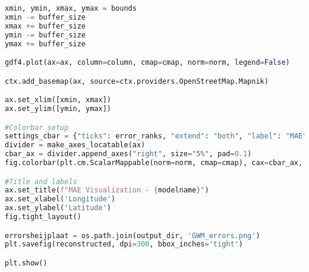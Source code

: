 \begin{lstlisting}[language=Python]
xmin, ymin, xmax, ymax = bounds
xmin -= buffer_size
xmax += buffer_size
ymin -= buffer_size
ymax += buffer_size

gdf4.plot(ax=ax, column=column, cmap=cmap, norm=norm, legend=False)

ctx.add_basemap(ax, source=ctx.providers.OpenStreetMap.Mapnik)

ax.set_xlim([xmin, xmax])
ax.set_ylim([ymin, ymax])

#Colorbar setup
settings_cbar = {"ticks": error_ranks, "extend": "both", "label": "MAE"}
divider = make_axes_locatable(ax)
cbar_ax = divider.append_axes("right", size="5%", pad=0.1)
fig.colorbar(plt.cm.ScalarMappable(norm=norm, cmap=cmap), cax=cbar_ax, **settings_cbar)

#Title and labels
ax.set_title(f"MAE Visualization - {modelname}")
ax.set_xlabel('Longitude')
ax.set_ylabel('Latitude')
fig.tight_layout()

errorsheijplaat = os.path.join(output_dir, 'GWM_errors.png')
plt.savefig(reconstructed, dpi=300, bbox_inches='tight')

plt.show()
\end{lstlisting}




















